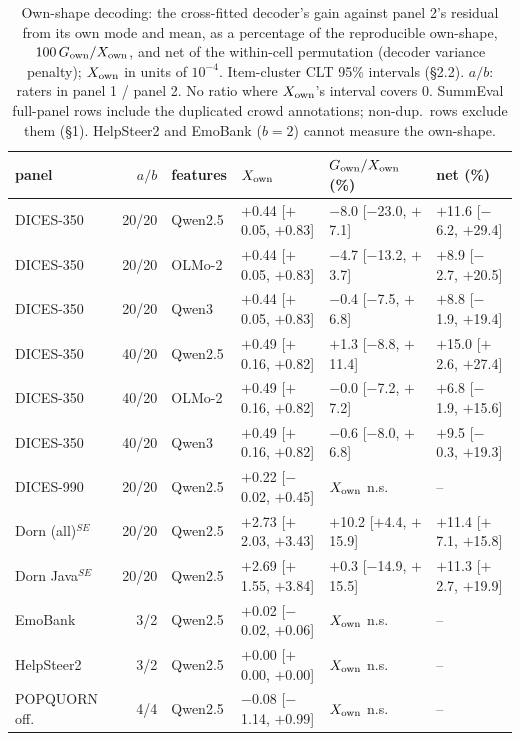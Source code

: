 \begin{table}[t]\centering\footnotesize
\caption{Own-shape decoding: the cross-fitted decoder's gain against panel 2's residual from its own mode and mean, as a percentage of the reproducible own-shape, $100\,G_{\rm own}/X_{\rm own}$, and net of the within-cell permutation (decoder variance penalty); $X_{\rm own}$ in units of $10^{-4}$. Item-cluster CLT 95\% intervals (\S2.2). $a/b$: raters in panel 1 / panel 2. No ratio where $X_{\rm own}$'s interval covers 0. SummEval full-panel rows include the duplicated crowd annotations; non-dup.\ rows exclude them (\S1). HelpSteer2 and EmoBank ($b=2$) cannot measure the own-shape.}\label{tab:own}
\begin{tabular}{lrllll}\toprule panel & $a/b$ & features & $X_{\rm own}$ & $G_{\rm own}/X_{\rm own}$ (\%) & net (\%) \\\midrule
DICES-350 & 20/20 & Qwen2.5 & $+$0.44 [$+$0.05, $+$0.83] & $-$8.0 [$-$23.0, $+$7.1] & $+$11.6 [$-$6.2, $+$29.4] \\
DICES-350 & 20/20 & OLMo-2 & $+$0.44 [$+$0.05, $+$0.83] & $-$4.7 [$-$13.2, $+$3.7] & $+$8.9 [$-$2.7, $+$20.5] \\
DICES-350 & 20/20 & Qwen3 & $+$0.44 [$+$0.05, $+$0.83] & $-$0.4 [$-$7.5, $+$6.8] & $+$8.8 [$-$1.9, $+$19.4] \\
DICES-350 & 40/20 & Qwen2.5 & $+$0.49 [$+$0.16, $+$0.82] & $+$1.3 [$-$8.8, $+$11.4] & $+$15.0 [$+$2.6, $+$27.4] \\
DICES-350 & 40/20 & OLMo-2 & $+$0.49 [$+$0.16, $+$0.82] & $-$0.0 [$-$7.2, $+$7.2] & $+$6.8 [$-$1.9, $+$15.6] \\
DICES-350 & 40/20 & Qwen3 & $+$0.49 [$+$0.16, $+$0.82] & $-$0.6 [$-$8.0, $+$6.8] & $+$9.5 [$-$0.3, $+$19.3] \\
DICES-990 & 20/20 & Qwen2.5 & $+$0.22 [$-$0.02, $+$0.45] & $X_{\rm own}$ n.s. & -- \\
Dorn (all)$^{SE}$ & 20/20 & Qwen2.5 & $+$2.73 [$+$2.03, $+$3.43] & $+$10.2 [$+$4.4, $+$15.9] & $+$11.4 [$+$7.1, $+$15.8] \\
Dorn Java$^{SE}$ & 20/20 & Qwen2.5 & $+$2.69 [$+$1.55, $+$3.84] & $+$0.3 [$-$14.9, $+$15.5] & $+$11.3 [$+$2.7, $+$19.9] \\
EmoBank & 3/2 & Qwen2.5 & $+$0.02 [$-$0.02, $+$0.06] & $X_{\rm own}$ n.s. & -- \\
HelpSteer2 & 3/2 & Qwen2.5 & $+$0.00 [$+$0.00, $+$0.00] & $X_{\rm own}$ n.s. & -- \\
POPQUORN off. & 4/4 & Qwen2.5 & $-$0.08 [$-$1.14, $+$0.99] & $X_{\rm own}$ n.s. & -- \\

\end{tabular}
\end{table}
